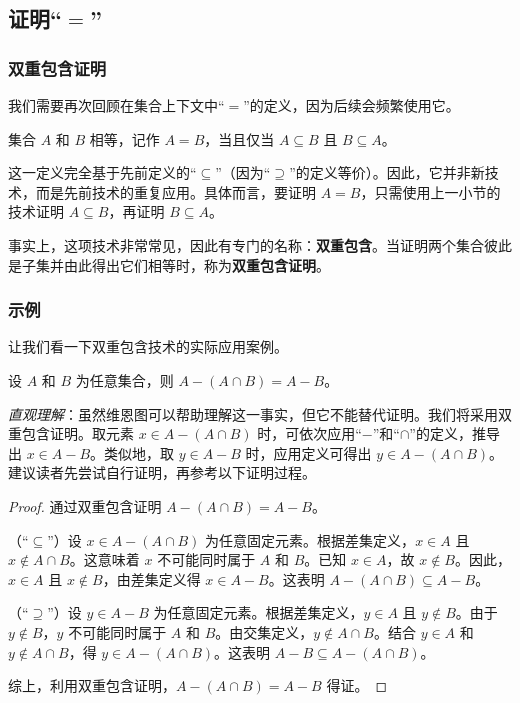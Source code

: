 \subsection{证明``$=$''}

\subsubsection*{双重包含证明}

我们需要再次回顾在集合上下文中``$=$''的定义，因为后续会频繁使用它。

\begin{definition}
    集合 $A$ 和 $B$ 相等，记作 $A = B$，当且仅当 $A \subseteq B$ 且 $B \subseteq A$。
\end{definition}

这一定义完全基于先前定义的``$\subseteq$''（因为``$\supseteq$''的定义等价）。因此，它并非新技术，而是先前技术的重复应用。具体而言，要证明 $A = B$，只需使用上一小节的技术证明 $A \subseteq B$，再证明 $B \subseteq A$。

事实上，这项技术非常常见，因此有专门的名称：\textbf{双重包含}。当证明两个集合彼此是子集并由此得出它们相等时，称为\textbf{双重包含证明}。

\subsubsection*{示例}

让我们看一下双重包含技术的实际应用案例。

\begin{lemma}
    设 $A$ 和 $B$ 为任意集合，则 $A - (A \cap B) = A - B$。
\end{lemma}

\emph{直观理解}：虽然维恩图可以帮助理解这一事实，但它不能替代证明。我们将采用双重包含证明。取元素 $x \in A - (A \cap B)$ 时，可依次应用``$-$''和``$\cap$''的定义，推导出 $x \in A - B$。类似地，取 $y \in A - B$ 时，应用定义可得出 $y \in A - (A \cap B)$。建议读者先尝试自行证明，再参考以下证明过程。

\begin{proof}
    通过双重包含证明 $A - (A \cap B) = A - B$。

    （``$\subseteq$''）设 $x \in A - (A \cap B)$ 为任意固定元素。根据差集定义，$x \in A$ 且 $x \notin A \cap B$。这意味着 $x$ 不可能同时属于 $A$ 和 $B$。已知 $x \in A$，故 $x \notin B$。因此，$x \in A$ 且 $x \notin B$，由差集定义得 $x \in A-B$。这表明 $A - (A \cap B) \subseteq A - B$。

    （``$\supseteq$''）设 $y \in A - B$ 为任意固定元素。根据差集定义，$y \in A$ 且 $y \notin B$。由于 $y \notin B$，$y$ 不可能同时属于 $A$ 和 $B$。由交集定义，$y \notin A \cap B$。结合 $y \in A$ 和 $y \notin A \cap B$，得 $y \in A - (A \cap B)$。这表明 $A - B \subseteq A - (A \cap B)$。

    综上，利用双重包含证明，$A - (A \cap B) = A - B$ 得证。
\end{proof}

